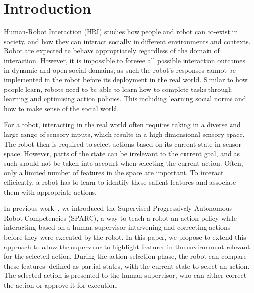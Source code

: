 \documentclass[letterpaper]{article} %
\begin{document}
\section{Introduction}

Human-Robot Interaction (HRI) studies how people and robot can co-exist in society, and how they can interact socially in different environments and
contexts. Robot are expected to behave appropriately regardless of the domain
of interaction. However, it is impossible to foresee all possible interaction outcomes in dynamic and open social domains, as such the robot's responses cannot be implemented in the robot before its deployment in the real world. Similar to
how people learn, robots need to be able to learn how to complete tasks through learning and optimising action policies. This including learning social norms and how to make sense of the social world.

For a robot, interacting in the real world often requires taking in a diverse and large range of sensory inputs, which results in a high-dimensional sensory space. The robot then is required to select actions based on its current state in sensor space. However,
 parts of the state can be irrelevant to the current goal, and
 as such should not be taken into account when selecting the current action. Often, only a limited number of
 features in the space are important. To interact efficiently, a robot has to
 learn to identify these salient features and associate them with appropriate actions.


In previous work~\cite{senft2015sparc,senft2017supervised}, we introduced the
Supervised Progressively Autonomous Robot Competencies (SPARC), a way to
teach a robot an action policy while interacting based on a human supervisor
intervening and correcting actions before they were executed by the robot. In this paper, we propose
to extend this approach to allow the supervisor to highlight features in the
environment relevant for the selected action. During the action selection
phase, the robot can compare these features, defined as partial states, with the
current state to select an action. The selected action is presented to the human supervisor, who can either correct the action or approve it for execution.
\end{document}
